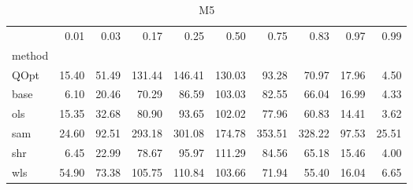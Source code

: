 \begin{table}
\caption{M5}
\label{ }
\begin{tabular}{lrrrrrrrrr}
\toprule
 & 0.01 & 0.03 & 0.17 & 0.25 & 0.50 & 0.75 & 0.83 & 0.97 & 0.99 \\
method &  &  &  &  &  &  &  &  &  \\
\midrule
QOpt & 15.40 & 51.49 & 131.44 & 146.41 & 130.03 & 93.28 & 70.97 & 17.96 & 4.50 \\
base & 6.10 & 20.46 & 70.29 & 86.59 & 103.03 & 82.55 & 66.04 & 16.99 & 4.33 \\
ols & 15.35 & 32.68 & 80.90 & 93.65 & 102.02 & 77.96 & 60.83 & 14.41 & 3.62 \\
sam & 24.60 & 92.51 & 293.18 & 301.08 & 174.78 & 353.51 & 328.22 & 97.53 & 25.51 \\
shr & 6.45 & 22.99 & 78.67 & 95.97 & 111.29 & 84.56 & 65.18 & 15.46 & 4.00 \\
wls & 54.90 & 73.38 & 105.75 & 110.84 & 103.66 & 71.94 & 55.40 & 16.04 & 6.65 \\
\bottomrule
\end{tabular}
\end{table}

